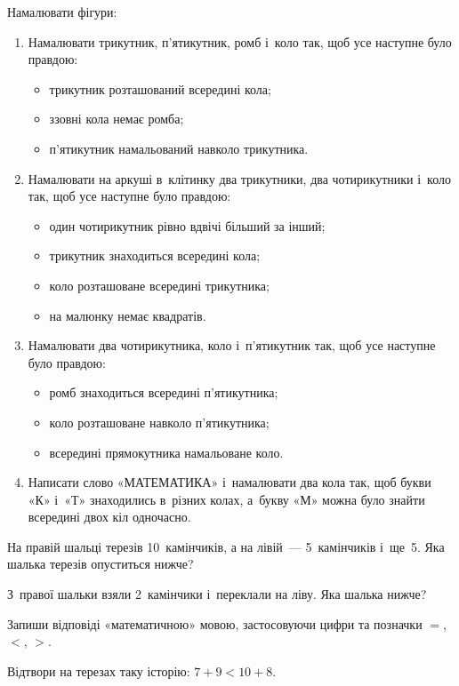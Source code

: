 \problem
Намалювати фігури:
\begin{enumerate}
    \item Намалювати трикутник, п'ятикутник, ромб і~коло так,
    щоб усе наступне було правдою:
    \begin{itemize}
        \item трикутник розташований всередині кола;
        \item ззовні кола немає ромба;
        \item п'ятикутник намальований навколо трикутника.
    \end{itemize}
    \item Намалювати на аркуші в~клітинку два трикутники,
    два чотирикутники і~коло так, щоб усе наступне було правдою:
    \begin{itemize}
        \item один чотирикутник рівно вдвічі більший за інший;
        \item трикутник знаходиться всередині кола;
        \item коло розташоване всередині трикутника;
        \item на малюнку немає квадратів.
    \end{itemize}
    \item Намалювати два чотирикутника, коло і~п'ятикутник так,
    щоб усе наступне було правдою:
    \begin{itemize}
        \item ромб знаходиться всередині п'ятикутника;
        \item коло розташоване навколо п'ятикутника;
        \item всередині прямокутника намальоване коло.
    \end{itemize}
    \item Написати слово «МАТЕМАТИКА» і~намалювати два кола так,
    щоб букви «К» і~«Т» знаходились в~різних колах,
    а~букву «М» можна було знайти всередині двох кіл одночасно.
\end{enumerate}


\problem
На правій шальці терезів 10~камінчиків, а на лівій~--- 5~камінчиків і~ще~5.
Яка шалька терезів опуститься нижче?

З~правої шальки взяли 2~камінчики і~переклали на ліву.
Яка шалька нижче?

Запиши відповіді «математичною» мовою, застосовуючи цифри
та позначки $=$, $<$, $>$.


\problem
Відтвори на терезах таку історію: $7+9 < 10+8$.


